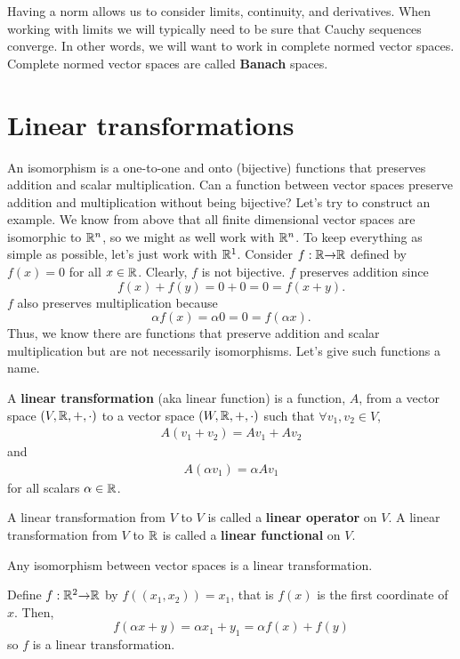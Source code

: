 Having a norm allows us to consider limits, continuity, and
derivatives. When working with limits we will typically need to be
sure that Cauchy sequences converge. In other words, we will want to
work in complete normed vector spaces. Complete normed vector spaces
are called \textbf{Banach} spaces. 


\section{Linear transformations}

An isomorphism is a one-to-one and onto (bijective) functions that
preserves addition and scalar multiplication. Can a function between
vector spaces preserve addition and multiplication without being
bijective?  Let's try to construct an example. We know from above that
all finite dimensional vector spaces are isomorphic to $\mathbb{R}^n$, so we
might as well work with $\mathbb{R}^n$. To keep everything as simple as
possible, let's just work with $\mathbb{R}^1$. Consider $f:\mathbb{R} {\rightarrow} \mathbb{R}$ defined
by $f(x) = 0$ for all $x \in \mathbb{R}$. Clearly, $f$ is not bijective. $f$
preserves addition since
\[ f(x) + f(y) = 0 + 0 = 0 = f(x+y). \]
$f$ also preserves multiplication because 
\[ \alpha f(x) = \alpha 0 = 0 = f(\alpha x). \]
Thus, we know there are functions that preserve addition and scalar
multiplication but are not necessarily isomorphisms. Let's give such
functions a name. 
\begin{definition}
  A \textbf{linear transformation} (aka linear function) is a
  function, $A$, from a vector space $(V,\mathbb{R},+,\cdot)$ to a vector
  space $(W,\mathbb{R},+,\cdot)$ such that $\forall v_1, v_2 \in V$,
  \begin{align*}
    A (v_1 + v_2) = A v_1 + A v_2 
  \end{align*}
  and 
  \begin{align*}
    A (\alpha v_1) = \alpha A v_1
  \end{align*}
  for all scalars $\alpha \in \mathbb{R}$.   

  A linear transformation from $V$ to $V$ is called a \textbf{linear
    operator} on $V$. A linear transformation from $V$ to $\mathbb{R}$ is
  called a \textbf{linear functional} on $V$.
\end{definition}
Any isomorphism between vector spaces is a linear
transformation. 
\begin{example}
  Define $f: \mathbb{R}^2 {\rightarrow} \mathbb{R}$ by $f( (x_1, x_2) ) = x_1$, that is $f(x)$ is
  the first coordinate of $x$. Then,
  \[ f(\alpha x + y) = \alpha x_1 + y_1 = \alpha f(x) + f(y) \]
  so $f$ is a linear transformation.
\end{example}


